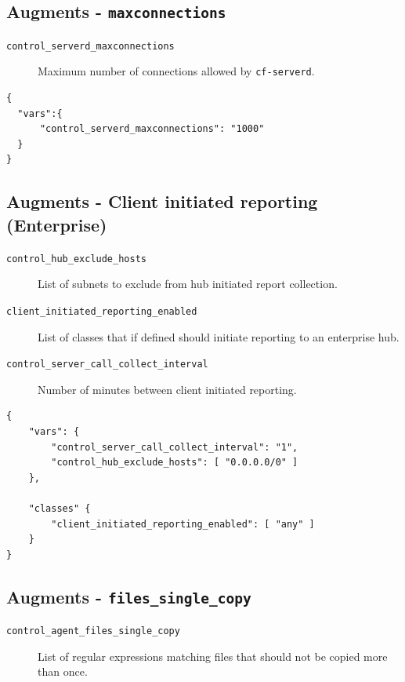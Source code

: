 \documentclass[11pt]{article}
\begin{document}
\subsection*{Augments - \texttt{maxconnections}}
\label{sec:org8d8674e}

\begin{description}
\item[{\texttt{control\_serverd\_maxconnections}}] Maximum number of connections allowed by
\texttt{cf-serverd}.
\end{description}

\begin{verbatim}
{
  "vars":{
      "control_serverd_maxconnections": "1000"
  }
}
\end{verbatim}

\subsection*{Augments - Client initiated reporting (Enterprise)}
\label{sec:org47a33d9}

\begin{description}
\item[{\texttt{control\_hub\_exclude\_hosts}}] List of subnets to exclude from hub initiated
report collection.
\item[{\texttt{client\_initiated\_reporting\_enabled}}] List of classes that if defined should
initiate reporting to an enterprise hub.
\item[{\texttt{control\_server\_call\_collect\_interval}}] Number of minutes between client
initiated reporting.
\end{description}

\begin{verbatim}
{
    "vars": {
        "control_server_call_collect_interval": "1",
        "control_hub_exclude_hosts": [ "0.0.0.0/0" ]
    },

    "classes" {
        "client_initiated_reporting_enabled": [ "any" ]
    }
}
\end{verbatim}

\subsection*{Augments - \texttt{files\_single\_copy}}
\label{sec:org49e3b9a}

\begin{description}
\item[{\texttt{control\_agent\_files\_single\_copy}}] List of regular expressions matching
files that should not be copied more than once.
\end{description}
\end{document}
